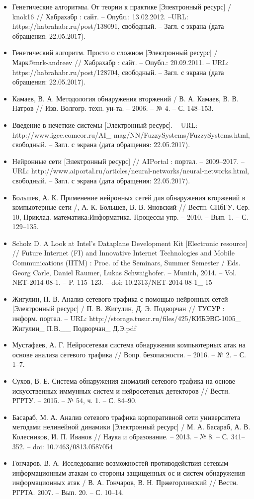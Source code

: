\begin{itemize}
\item Генетические алгоритмы. От теории к практике [Электронный ресурс] / knok16 // Хабрахабр : сайт. – Опубл.: 13.02.2012. –URL: https://habrahabr.ru/post/138091, свободный. – Загл. с экрана (дата обращения: 22.05.2017).
\item Генетический алгоритм. Просто о сложном [Электронный ресурс] / Марк@mrk-andreev // Хабрахабр : сайт. – Опубл.: 20.09.2011. – URL: https://habrahabr.ru/post/128704, свободный. – Загл. с экрана (дата обращения: 22.05.2017).
\item Камаев, В. А. Методология обнаружения вторжений / В. А. Камаев, В. В. Натров // Изв. Волгогр. техн. ун-та. – 2006. – № 4. – С. 148–153.
\item Введение в нечеткие системы [Электронный ресурс]. – URL: \\http://www.igce.comcor.ru/AI\_ mag/NN/FuzzySystems/FuzzySystems.html, свободный. – Загл. с экрана (дата обращения: 22.05.2017).
\item Нейронные сети [Электронный ресурс] // AIPortal : портал. – 2009–2017. – URL: http://www.aiportal.ru/articles/neural-networks/neural-networks.html, свободный. – Загл. с экрана (дата обращения: 22.05.2017).
\item Большев, А. К. Применение нейронных сетей для обнаружения вторжений в компьютерные сети /, А. К. Большев, В. В. Яновский // Вестн. СПбГУ. Сер. 10, Приклад. математика:Информатика. Процессы упр. – 2010. – Вып. 1. – С. 129–135. 
\item Scholz D. A Look at Intel’s Dataplane Development Kit [Electronic resource] // Future Internet (FI) and Innovative Internet Technologies and Mobile Communications (IITM) : Proc. of the Seminars, Summer Semester / Eds. Georg Carle, Daniel Raumer, Lukas Schwaighofer. – Munich, 2014. – Vol. NET-2014-08-1. – P. 115–123. – doi: 10.2313/NET-2014-08-1\_ 15
\item Жигулин, П. В. Анализ сетевого трафика с помощью нейронных сетей [Электронный ресурс] / П. В. Жигулин, Д. Э. Подворчан // ТУСУР : информ. портал. – URL: http://storage.tusur.ru/files/425/КИБЭВС-1005\_ Жигулин\_ П.В.\_\_ Подворчан\_ Д.Э.pdf
\item Мустафаев, А. Г. Нейросетевая система обнаружения компьютерных атак на основе анализа сетевого трафика // Вопр. безопасности. – 2016. – № 2. – С. 1–7. 
\item Сухов, В. Е. Система обнаружения аномалий сетевого трафика на основе искусственных иммунных систем и нейросетевых детекторов // Вестн. РГРТУ. – 2015. – № 54, ч. 1. – С. 84–90.
\item Басараб, М. А. Анализ сетевого трафика корпоративной сети университета методами нелинейной динамики [Электронный ресурс] / М. А. Басараб, А. В. Колесников, И. П. Иванов // Наука и образование. – 2013. – № 8. – С. 341–352. – doi: 10.7463/0813.0587054
\item Гончаров, В. А. Исследование возможностей противодействия сетевым информационным атакам со стороны защищенных ос и систем обнаружения информационных атак / В. А. Гончаров, В. Н. Пржегорлинский // Вестн. РГРТА. 2007. – Вып. 20. – С. 10–14.
\end{itemize}
